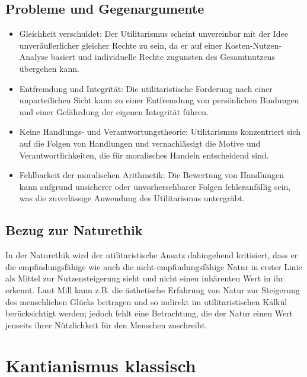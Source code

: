 \documentclass{article}
\begin{document}
\subsection{Probleme und Gegenargumente}
\begin{itemize}
	\item Gleichheit verschuldet: Der Utilitarismus scheint unvereinbar mit der Idee unveräußerlicher gleicher Rechte zu sein, da er auf einer Kosten-Nutzen-Analyse basiert und individuelle Rechte zugunsten des Gesamtnutzens übergehen kann.

	\item Entfremdung und Integrität: Die utilitaristische Forderung nach einer unparteilichen Sicht kann zu einer Entfremdung von persönlichen Bindungen und einer Gefährdung der eigenen Integrität führen.

	\item Keine Handlungs- und Verantwortungstheorie: Utilitarismus konzentriert sich auf die Folgen von Handlungen und vernachlässigt die Motive und Verantwortlichkeiten, die für moralisches Handeln entscheidend sind.

	\item Fehlbarkeit der moralischen Arithmetik: Die Bewertung von Handlungen kann aufgrund unsicherer oder unvorhersehbarer Folgen fehleranfällig sein, was die zuverlässige Anwendung des Utilitarismus untergräbt.
\end{itemize}

\subsection{Bezug zur Naturethik}
In der Naturethik wird der utilitaristische Ansatz dahingehend kritisiert, dass er die empfindungsfähige wie auch die nicht-empfindungsfähige Natur in erster Linie als Mittel zur Nutzensteigerung sieht und nicht einen inhärenten Wert in ihr erkennt. Laut Mill kann z.B. die ästhetische Erfahrung von Natur zur Steigerung des menschlichen Glücks beitragen und so indirekt im utilitaristischen Kalkül berücksichtigt werden; jedoch fehlt eine Betrachtung, die der Natur einen Wert jenseits ihrer Nützlichkeit für den Menschen zuschreibt.


\newpage
\section{Kantianismus klassisch}
\end{document}
